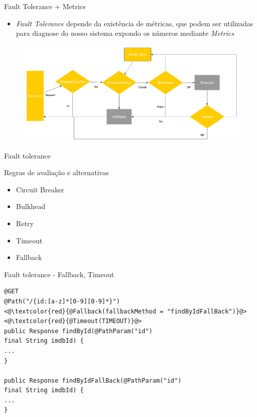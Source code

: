\documentclass{beamer}
\begin{document}
\begin{frame}{Fault Tolerance + Metrics}

\begin{itemize}
	\item \textit{Fault Tolerance} depende da existência de métricas, que podem ser utilizadas para diagnose do nosso sistema expondo os números mediante \textit{Metrics}
\end{itemize}

\begin{figure}
	\centering
	\includegraphics[width=\linewidth]{Images/falldata}
\end{figure}

\end{frame}


\begin{frame}{Fault tolerance}

Regras de avaliação e alternativas
\begin{itemize}
\item Circuit Breaker
\item Bulkhead
\item Retry
\item Timeout
\item Fallback
\end{itemize}

\end{frame}


\begin{frame}[fragile]{Fault tolerance - Fallback, Timeout}
\begin{lstlisting}
@GET
@Path("/{id:[a-z]*[0-9][0-9]*}")
<@\textcolor{red}{@Fallback(fallbackMethod = "findByIdFallBack")}@>
<@\textcolor{red}{@Timeout(TIMEOUT)}@>
public Response findById(@PathParam("id") 
final String imdbId) {
...
}

public Response findByIdFallBack(@PathParam("id") 
final String imdbId) {
...
}
\end{lstlisting}
\end{frame}
\end{document}
